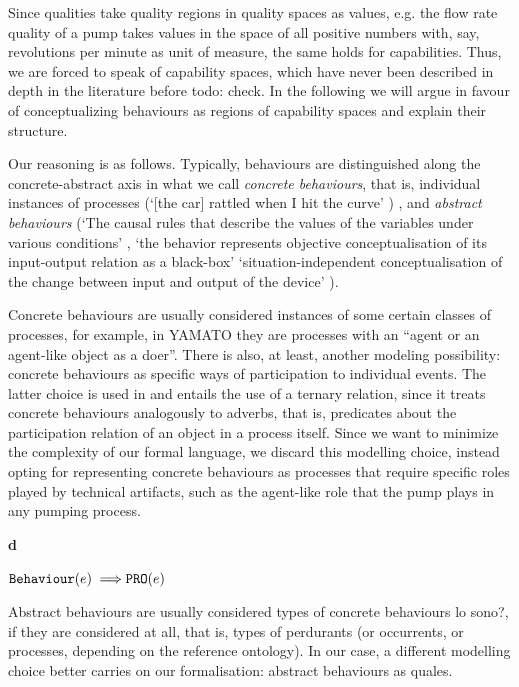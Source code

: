 \documentclass[crcready]{iosart2x}
\newcommand{\bflist}{\begin{list}{}{\setlength{\topsep}{2mm}\setlength{\partopsep}{0mm}\setlength{\parsep}{0mm}\setlength{\leftmargin}{9mm}\setlength{\labelwidth}{8mm}}}
\newcommand{\eflist}{\end{list}}
\newcommand{\DefLabel}{\textrm{d}}
\newcounter{cntdef}
\newcommand{\mydf}[1]{\refstepcounter{cntdef}\begin{small}{\bf \DefLabel\thecntdef\label{def:#1}}\end{small}}
\newcommand{\generalStyle}[1]{\texttt{#1}}
\newcommand{\uniRel}[2]{\generalStyle{#1}(#2)}
\newcommand{\myfi}{\hspace{0.9mm} \Longrightarrow}
\newcommand{\YAMATO}{\textsc{YAMATO}\xspace}
\newcommand{\DOLCEProcess}[1]{\uniRel{PRO}{#1}}
\newcommand{\BehaviourConcrete}[1]{\uniRel{Behaviour}{#1}}
\newcommand{\firstTimeKeyWord}[1]{\textit{#1}}
\newcommand{\TODO}[1]{{\color{red} #1}}
\begin{document}
Since qualities take quality regions in quality spaces as values, e.g. the flow rate quality of a pump takes values in the space of all positive numbers with, say, revolutions per minute as unit of measure, the same holds for capabilities. 
Thus, we are forced to speak of capability spaces, which have never been described in depth in the literature before \TODO{todo: check}. In the following we will argue in favour of conceptualizing behaviours as regions of capability spaces and explain their structure. 

Our reasoning is as follows. 
Typically, behaviours are distinguished along the concrete-abstract axis in what we call \firstTimeKeyWord{concrete behaviours}, that is, individual instances of processes (`[the car] rattled when I hit the curve' \cite{chandrasekaranFunctionDeviceRepresentation2000})%
, and 
\firstTimeKeyWord{abstract behaviours} (`The causal rules that describe the values of the variables under various conditions' \cite{chandrasekaranFunctionDeviceRepresentation2000}, `the behavior represents objective conceptualisation of its input-output relation as a black-box' \cite{kitamuraOntologicalModelDevice2006} 
`situation-independent conceptualisation of the change between input and output of the device' \cite{mizoguchiFunctionalOntologyArtifacts2009}). 

Concrete behaviours are usually considered instances of some certain classes of processes, for example, in \YAMATO they are processes with an ``agent or an agent-like object as a doer''. There is also, at least, another modeling possibility: concrete behaviours as specific ways of participation to individual events. 
The latter choice is used in \cite{borgoFormalOntologicalPerspective2009} and entails the use of a ternary relation, since it treats concrete behaviours analogously to adverbs, that is, predicates about the participation relation of an object in a process itself. Since we want to minimize the complexity of our formal language, we discard this modelling choice, instead opting for 
representing concrete behaviours as processes that require specific roles played by technical artifacts, such as the agent-like role that the pump plays in any pumping process.
\bflist
\item[\mydf{BehaviourConcrete}] $ \BehaviourConcrete{e} \myfi \DOLCEProcess{e} $ 
\eflist

Abstract behaviours are usually considered types of concrete behaviours \TODO{lo sono?}, if they are considered at all, that is, types of perdurants (or occurrents, or processes, depending on the reference ontology). In our case, a different modelling choice better carries on our formalisation: abstract behaviours as quales.
\end{document}
